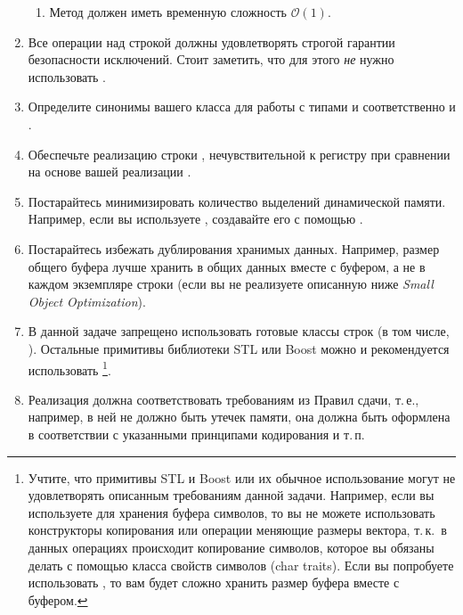 \documentclass[a4paper,10pt]{article}
\begin{document}
\begin{enumerate}
\begin{enumerate}
   \item Метод  должен иметь временную сложность $\mathcal{O}(1)$.
  \end{enumerate}

 \item Все операции над строкой должны удовлетворять строгой гарантии безопасности исключений. Стоит заметить, что для этого {\it не} нужно использовать .

 \item Определите синонимы вашего класса для работы с типами  и  соответственно  и .

 \item Обеспечьте реализацию строки ,
 нечувствительной к регистру при сравнении на основе вашей реализации .
 
 \item Постарайтесь минимизировать количество выделений динамической памяти. Например, если вы используете , создавайте его с помощью .
 
 \item Постарайтесь избежать дублирования хранимых данных. Например, размер общего буфера лучше хранить в общих данных вместе с буфером, а не в каждом экземпляре строки (если вы не реализуете описанную ниже {\it Small Object Optimization}).

 \item В данной задаче запрещено использовать готовые классы строк (в том числе, ). Остальные примитивы библиотеки STL или Boost можно и рекомендуется использовать%
\footnote{Учтите, что примитивы STL и Boost или их обычное использование могут не удовлетворять описанным требованиям данной задачи. Например, если вы используете  для хранения буфера символов, то вы не можете использовать конструкторы копирования или операции меняющие размеры вектора, т.\,к.~в данных операциях происходит копирование символов, которое вы обязаны делать с помощью класса свойств символов (char traits).
Если вы попробуете использовать , то вам будет сложно хранить размер буфера вместе с буфером.}.
 
 \item Реализация должна соответствовать требованиям из Правил сдачи,
 т.\,е., например, в ней не должно быть утечек памяти,
 она должна быть оформлена в соответствии с указанными принципами кодирования и т.\,п.
\end{enumerate}
\end{document}
